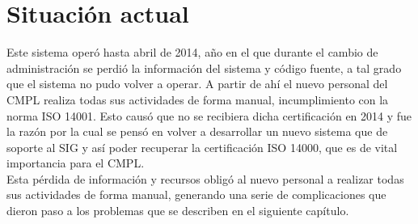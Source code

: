 	\section{Situación actual}
	Este sistema operó hasta abril de 2014, año en el que durante el cambio de administración se perdió la información del sistema y código fuente, a  tal grado que el sistema no pudo volver a operar. A partir de ahí el nuevo personal del CMPL realiza todas sus actividades de forma manual, incumplimiento con la norma ISO 14001. Esto causó que no se recibiera dicha certificación en 2014 y fue la razón por la cual se pensó en volver a desarrollar un nuevo sistema que de soporte al SIG y así poder recuperar la certificación ISO 14000, que es de vital importancia para el CMPL.\\
	
	Esta pérdida de información y recursos obligó al nuevo personal a realizar todas sus actividades de forma manual, generando una serie de complicaciones que dieron paso a los problemas que se describen en el siguiente capítulo.
